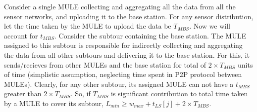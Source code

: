Consider a single MULE collecting and aggregating all the data from all the sensor networks, and uploading it to the base station. For any sensor distribution, let the time taken by the MULE to upload the data be $T_{MBS}$. Now we will account for $t_{MBS}$. Consider the subtour containing the base station. The MULE assigned to this subtour is responsible for indirectly collecting and aggregating the data from all other subtours and delivering it to the base station. For this, it sends/recieves from other MULEs and the base station for total of $2 \times T_{MBS}$ units of time (simplistic assumption, neglecting time spent in P2P protocol between MULEs). Clearly, for any other subtour, its assigned MULE can not have a $t_{MBS}$ greater than $2 \times T_{MBS}$. So, if $T_{MBS}$ is significant contribution to total time taken by a MULE to cover its subtour, $L_{min} \ge w_{max}+t_{LS}[j]+2 \times T_{MBS}$.
